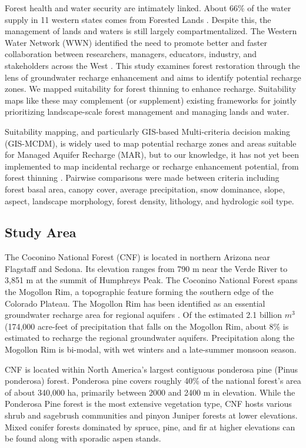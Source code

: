 \documentclass[
  number,
  preprint,
  3p,
  onecolumn]{elsarticle}
\begin{document}
Forest health and water security are intimately linked. About 66\% of
the water supply in 11 western states comes from Forested Lands
\citep{brown_source_2005}. Despite this, the management of lands and
waters is still largely compartmentalized. The Western Water Network
(WWN) identified the need to promote better and faster collaboration
between researchers, managers, educators, industry, and stakeholders
across the West \citep{hansen2024}. This study examines forest
restoration through the lens of groundwater recharge enhancement and
aims to identify potential recharge zones. We mapped suitability for
forest thinning to enhance recharge. Suitability maps like these may
complement (or supplement) existing frameworks for jointly prioritizing
landscape-scale forest management and managing lands and water.

Suitability mapping, and particularly GIS-based Multi-criteria decision
making (GIS-MCDM), is widely used to map potential recharge zones and
areas suitable for Managed Aquifer Recharge (MAR), but to our knowledge,
it has not yet been implemented to map incidental recharge or recharge
enhancement potential, from forest thinning
\citep{fathi2021, rajashekar2023, rahman2012}. Pairwise comparisons were
made between criteria including forest basal area, canopy cover, average
precipitation, snow dominance, slope, aspect, landscape morphology,
forest density, lithology, and hydrologic soil type.

\subsection{Study Area}\label{study-area}

The Coconino National Forest (CNF) is located in northern Arizona near
Flagstaff and Sedona. Its elevation ranges from 790 m near the Verde
River to 3,851 m at the summit of Humphreys Peak. The Coconino National
Forest spans the Mogollon Rim, a topographic feature forming the
southern edge of the Colorado Plateau. The Mogollon Rim has been
identified as an essential groundwater recharge area for regional
aquifers \citep{parker2005}. Of the estimated 2.1 billion \(m^3\)
(174,000 acre-feet of precipitation that falls on the Mogollon Rim,
about 8\% is estimated to recharge the regional groundwater
aquifers\citep{parker2005}. Precipitation along the Mogollon Rim is
bi-modal, with wet winters and a late-summer monsoon season.

CNF is located within North America's largest contiguous ponderosa pine
(Pinus ponderosa) forest. Ponderosa pine covers roughly 40\% of the
national forest's area of about 340,000 ha, primarily between 2000 and
2400 m in elevation. While the Ponderosa Pine forest is the most
extensive vegetation type, CNF hosts various shrub and sagebrush
communities and pinyon Juniper forests at lower elevations. Mixed
conifer forests dominated by spruce, pine, and fir at higher elevations
can be found along with sporadic aspen stands.
\end{document}
